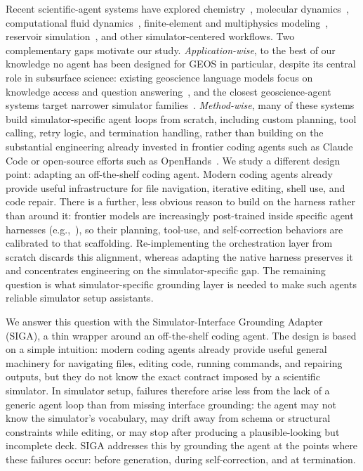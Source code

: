 \documentclass{article}
\begin{document}
Recent scientific-agent systems have explored chemistry~\citep{bran2024chemcrow,boiko2023coscientist}, molecular dynamics~\citep{shi2026mdagent2,zhao2026polyjarvis,guilbert2025dynamate}, computational fluid dynamics~\citep{chen2024metaopenfoam,yue2025foamagent,pandey2025openfoamgpt}, finite-element and multiphysics modeling~\citep{zhan2025mooseagent,mcpsim2026,ni2024mechagents}, reservoir simulation~\citep{moyner2026jutulgpt}, and other simulator-centered workflows. Two complementary gaps motivate our study. \emph{Application-wise}, to the best of our knowledge no agent has been designed for GEOS in particular, despite its central role in subsurface science: existing geoscience language models focus on knowledge access and question answering~\citep{deng2023k2,lin2024geogalactica}, and the closest geoscience-agent systems target narrower simulator families~\citep{bekele2025geosim,li2025seismologyagent,moyner2026jutulgpt}. \emph{Method-wise}, many of these systems build simulator-specific agent loops from scratch, including custom planning, tool calling, retry logic, and termination handling, rather than building on the substantial engineering already invested in frontier coding agents such as Claude Code or open-source efforts such as OpenHands~\citep{wang2024openhands}. We study a different design point: adapting an off-the-shelf coding agent. Modern coding agents already provide useful infrastructure for file navigation, iterative editing, shell use, and code repair. There is a further, less obvious reason to build on the harness rather than around it: frontier models are increasingly post-trained inside specific agent harnesses (e.g.,~\citealp{cursor2026composer2}), so their planning, tool-use, and self-correction behaviors are calibrated to that scaffolding. Re-implementing the orchestration layer from scratch discards this alignment, whereas adapting the native harness preserves it and concentrates engineering on the simulator-specific gap. The remaining question is what simulator-specific grounding layer is needed to make such agents reliable simulator setup assistants.

We answer this question with the Simulator-Interface Grounding Adapter (SIGA), a thin wrapper around an off-the-shelf coding agent. The design is based on a simple intuition: modern coding agents already provide useful general machinery for navigating files, editing code, running commands, and repairing outputs, but they do not know the exact contract imposed by a scientific simulator. In simulator setup, failures therefore arise less from the lack of a generic agent loop than from missing interface grounding: the agent may not know the simulator’s vocabulary, may drift away from schema or structural constraints while editing, or may stop after producing a plausible-looking but incomplete deck. SIGA addresses this by grounding the agent at the points where these failures occur: before generation, during self-correction, and at termination.
\end{document}
